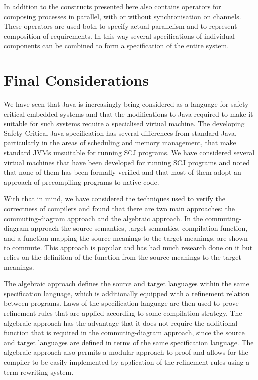 \documentclass[a4paper,10pt]{report}
\begin{document}
In addition to the constructs presented here \Circus{} also contains operators
for composing processes in parallel, with or without synchronisation on
channels.  These operators are used both to specify actual parallelism and to
represent composition of requirements.  In this way several \Circus{}
specifications of individual components can be combined to form a specification
of the entire system.

\section{Final Considerations}
\label{final-considerations-section}


We have seen that Java is increasingly being considered as a language for
safety-critical embedded systems and that the modifications to Java required to
make it suitable for such systems require a specialised virtual machine.  The
developing Safety-Critical Java specification has several differences from
standard Java, particularly in the areas of scheduling and memory management,
that make standard JVMs unsuitable for running SCJ programs.  We have considered
several virtual machines that have been developed for running SCJ programs and
noted that none of them has been formally verified and that most of them adopt
an approach of precompiling programs to native code.

With that in mind, we have considered the techniques used to verify the
correctness of compilers and found that there are two main approaches: the
commuting-diagram approach and the algebraic approach.  In the commuting-diagram
approach the source semantics, target semantics, compilation function, and a
function mapping the source meanings to the target meanings, are shown to
commute.  This approach is popular and has had much research done on it but
relies on the definition of the function from the source meanings to the target
meanings.

The algebraic approach defines the source and target languages within the same
specification language, which is additionally equipped with a refinement
relation between programs.  Laws of the specification language are then used to
prove refinement rules that are applied according to some compilation strategy.
The algebraic approach has the advantage that it does not require the additional
function that is required in the commuting-diagram approach, since the source
and target languages are defined in terms of the same specification language.
The algebraic approach also permits a modular approach to proof and allows for
the compiler to be easily implemented by application of the refinement rules
using a term rewriting system.
\end{document}
